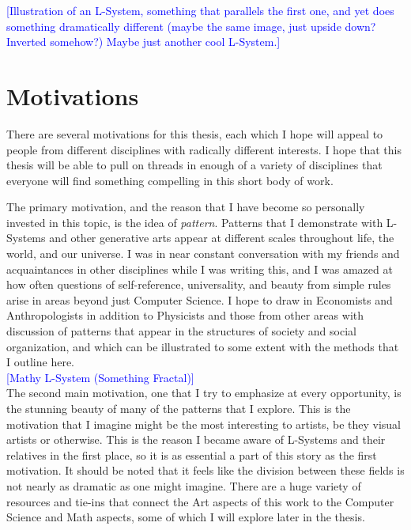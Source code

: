 \documentclass[12pt,twoside]{reedthesis}
\begin{document}
\textcolor{blue}{[Illustration of an L-System, something that parallels the first one, and yet does something dramatically different (maybe the same image, just upside down? Inverted somehow?) Maybe just another cool L-System.]}

\section{Motivations}

There are several motivations for this thesis, each which I hope will appeal to people from different disciplines with radically different interests. I hope that this thesis will be able to pull on threads in enough of a variety of disciplines that everyone will find something compelling in this short body of work.

	The primary motivation, and the reason that I have become so personally invested in this topic, is the idea of \textit{pattern}. Patterns that I demonstrate with L-Systems and other generative arts appear at different scales throughout life, the world, and our universe. I was in near constant conversation with my friends and acquaintances in other disciplines while I was writing this, and I was amazed at how often questions of self-reference, universality, and beauty from simple rules arise in areas beyond just Computer Science. I hope to draw in Economists and Anthropologists in addition to Physicists and those from other areas with discussion of patterns that appear in the structures of society and social organization, and which can be illustrated to some extent with the methods that I outline here.\\

\textcolor{blue}{[Mathy L-System (Something Fractal)]}\\

	The second main motivation, one that I try to emphasize at every opportunity, is the stunning beauty of many of the patterns that I explore. This is the motivation that I imagine might be the most interesting to artists, be they visual artists or otherwise. This is the reason I became aware of L-Systems and their relatives in the first place, so it is as essential a part of this story as the first motivation. It should be noted that it feels like the division between these fields is not nearly as dramatic as one might imagine. There are a huge variety of resources and tie-ins that connect the Art aspects of this work to the Computer Science and Math aspects, some of which I will explore later in the thesis. 
	
\end{document}
